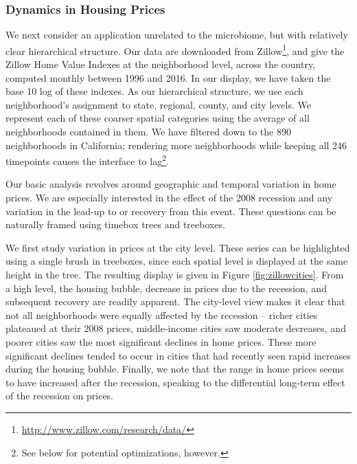 \documentclass[12pt]{article}
\begin{document}
\subsubsection*{Dynamics in Housing Prices}\label{zillow-study}

We next consider an application unrelated to the microbiome, but with
relatively clear hierarchical structure. Our data are downloaded from
Zillow\footnote{\url{http://www.zillow.com/research/data/}}, and give
the Zillow Home Value Indexes at the neighborhood level, across the
country, computed monthly between 1996 and 2016. In our display, we have
taken the base 10 log of these indexes. As our hierarchical structure,
we use each neighborhood's assignment to state, regional, county, and
city levels. We represent each of these coarser spatial categories using
the average of all neighborhoods contained in them. We have filtered
down to the 890 neighborhoods in California; rendering more
neighborhoods while keeping all 246 timepoints causes the interface to
lag\footnote{See below for potential optimizations, however.}.

Our basic analysis revolves around geographic and temporal variation in
home prices. We are especially interested in the effect of the 2008
recession and any variation in the lead-up to or recovery from this
event. These questions can be naturally framed using timebox trees and
treeboxes.

We first study variation in prices at the city level. These series can
be highlighted using a single brush in treeboxes, since each spatial
level is displayed at the same height in the tree. The resulting display
is given in Figure \ref{fig:zillowcities}. From a high level, the
housing bubble, decrease in prices due to the recession, and subsequent
recovery are readily apparent. The city-level view makes it clear that
not all neighborhoods were equally affected by the recession -- richer
cities plateaued at their 2008 prices, middle-income cities saw moderate
decreases, and poorer cities saw the most significant declines in home
prices. These more significant declines tended to occur in cities that
had recently seen rapid increases during the housing bubble. Finally, we
note that the range in home prices seems to have increased after the
recession, speaking to the differential long-term effect of the
recession on prices.
\end{document}
